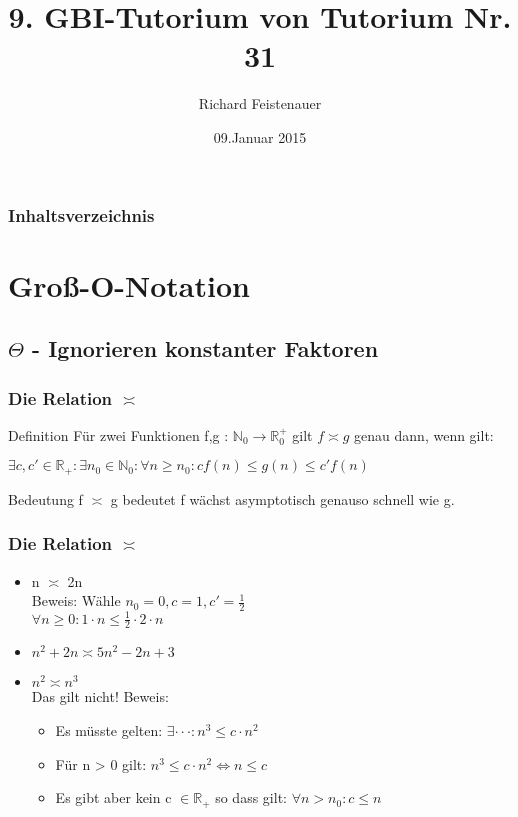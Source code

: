 \documentclass{beamer}
\author{Richard Feistenauer}
\title{9. GBI-Tutorium von Tutorium Nr. 31}
\date{09.Januar 2015}
\begin{document}
\begin {frame}
	\titlepage
\end {frame}

\begin {frame}
	\frametitle {Inhaltsverzeichnis}
	\tableofcontents
\end {frame}

\section{Gro{\ss}-O-Notation} 
\subsection{$\Theta$ - Ignorieren konstanter Faktoren}

\begin{frame}
	\frametitle{Die Relation $\asymp$}
	\begin{block}{Definition}
		F\"ur zwei Funktionen f,g : $ \mathbb N_0 \rightarrow  \mathbb R_0^+$ gilt $f \asymp  g$ genau dann, wenn gilt: \\
		\begin{center}
			$\exists c, c' \in \mathbb R_+ : \exists n_0 \in \mathbb N_0 : \forall n \ge n_0: cf(n) \le g(n) \le c'f(n)$
		\end{center}
	\end{block}

	\begin{block}{Bedeutung}
		f $\asymp$ g bedeutet f w\"achst asymptotisch genauso schnell wie g.
	\end{block}
\end{frame}


\begin{frame}
	\frametitle{Die Relation $\asymp$}
	\begin{example}
		\begin{itemize}
			\item n $\asymp$ 2n \\
				Beweis: W\"ahle $n_0 = 0, c = 1, c' = \frac{1}{2}$ \\
				$\forall n \ge 0 : 1 \cdot n \le \frac{1}{2} \cdot 2 \cdot n$
			\item $n^2 + 2n \asymp 5n^2 -2n +3$
			\item $n^2 \asymp n^3$ \\
				Das gilt nicht! Beweis: \\
			\begin{itemize}
				\item Es m\"usste gelten: $\exists \cdot \cdot \cdot : n^3 \le c \cdot n^2$
				\item F\"ur n > 0 gilt: $n^3 \le c \cdot n^2 \Leftrightarrow n \le c$
				\item Es gibt aber kein c $\in \mathbb R_+$ so dass gilt: $\forall n > n_0 : c \le n$
			\end{itemize}
		\end{itemize}
	\end{example}
\end{frame}
\end{document}
